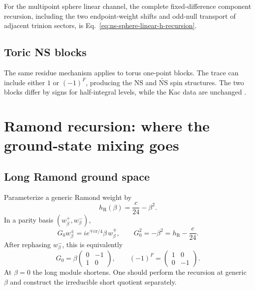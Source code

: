 \documentclass[11pt]{article}
\newcommand{\NS}{\mathrm{NS}}
\newcommand{\R}{\mathrm{R}}
\begin{document}
For the multipoint sphere linear channel, the complete fixed-difference
component recursion, including the two endpoint-weight shifts and odd-null
transport of adjacent trinion sectors, is
Eq.~\eqref{eq:ns-sphere-linear-h-recursion}.

\subsection{Toric NS blocks}

The same residue mechanism applies to torus one-point blocks.  The trace can
include either \(1\) or \((-1)^F\), producing the NS and
\(\widetilde{\NS}\) spin structures.  The two blocks differ by signs for
half-integral levels, while the Kac data are unchanged
\cite{HadaszJaskolskiSuchanek2012Toric}.

\section{Ramond recursion: where the ground-state mixing goes}
\label{sec:r-recursion}

\subsection{Long Ramond ground space}

Parameterize a generic Ramond weight by
\begin{equation}
 h_\R(\beta)=\frac{c}{24}-\beta^2.
 \label{eq:r-weight}
\end{equation}
In a parity basis \((w_\beta^+,w_\beta^-)\),
\begin{equation}
 G_0w_\beta^\pm
 =
 i e^{\mp i\pi/4}\beta\,w_\beta^\mp,
 \qquad
 G_0^2=-\beta^2=h_\R-\frac{c}{24}.
 \label{eq:r-ground-action}
\end{equation}
After rephasing \(w_\beta^-\), this is equivalently
\begin{equation}
 G_0
 =
 \beta
 \begin{pmatrix}0&-1\\1&0\end{pmatrix},
 \qquad
 (-1)^F=
 \begin{pmatrix}1&0\\0&-1\end{pmatrix}.
 \label{eq:r-simple-matrices}
\end{equation}
At \(\beta=0\) the long module shortens.  One should perform the recursion at
generic \(\beta\) and construct the irreducible short quotient separately.
\end{document}
